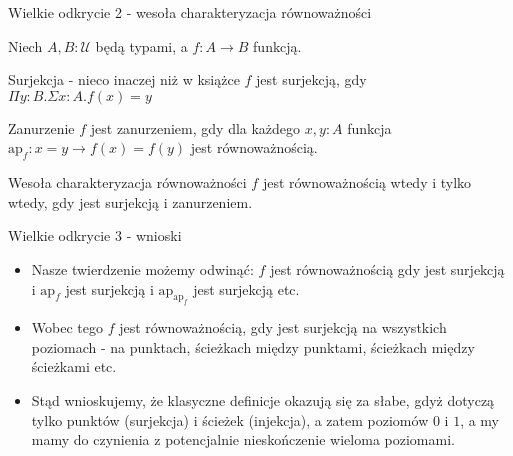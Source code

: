 \documentclass{beamer}
\newcommand{\U}{\mathcal{U}}
\begin{document}
\begin{frame}{Wielkie odkrycie 2 - wesoła charakteryzacja równoważności}

Niech $A, B : \U$ będą typami, a $f: A \to B$ funkcją.

\begin{block}{Surjekcja - nieco inaczej niż w książce}
$f$ jest surjekcją, gdy $\Pi y : B. \Sigma x : A. f(x) = y$
\end{block}

\begin{block}{Zanurzenie}
$f$ jest zanurzeniem, gdy dla każdego $x, y : A$ funkcja $\text{ap}_f : x = y \to f(x) = f(y)$ jest równoważnością.
\end{block}

\begin{block}{Wesoła charakteryzacja równoważności}
$f$ jest równoważnością wtedy i tylko wtedy, gdy jest surjekcją i zanurzeniem.
\end{block}

\end{frame}

\begin{frame}{Wielkie odkrycie 3 - wnioski}
\begin{itemize}
	\item Nasze twierdzenie możemy odwinąć: $f$ jest równoważnością gdy jest surjekcją i $\text{ap}_f$ jest surjekcją i $\text{ap}_{\text{ap}_f}$ jest surjekcją etc.
	\item Wobec tego $f$ jest równoważnością, gdy jest surjekcją na wszystkich poziomach - na punktach, ścieżkach między punktami, ścieżkach między ścieżkami etc.
	\item Stąd wnioskujemy, że klasyczne definicje okazują się za słabe, gdyż dotyczą tylko punktów (surjekcja) i ścieżek (injekcja), a zatem poziomów $0$ i $1$, a my mamy do czynienia z potencjalnie nieskończenie wieloma poziomami.
\end{itemize}
\end{frame}
\end{document}
